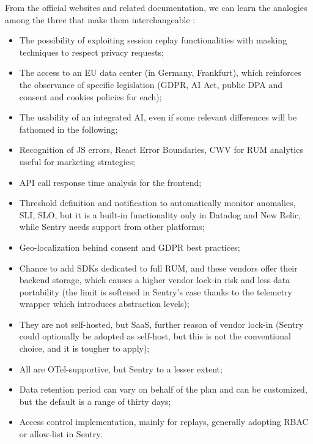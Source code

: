 \documentclass[12pt,a4paper,openright,twoside]{book}
\begin{document}
From the official websites and related documentation, we can learn the analogies among the three that make them interchangeable \cite{Datadog,NewRelic,Sentry}:
\begin{itemize}
    \item The possibility of exploiting session replay functionalities with masking techniques to respect privacy requests;
    \item The access to an EU data center (in Germany, Frankfurt), which reinforces the observance of specific legislation (\ac{GDPR}, AI Act, public DPA and consent and cookies policies for each);
    \item The usability of an integrated AI, even if some relevant differences will be fathomed in the following;
    \item Recognition of JS errors, React Error Boundaries, \ac{CWV} for RUM analytics useful for marketing strategies; 
    \item API call response time analysis for the frontend;
    \item Threshold definition and notification to automatically monitor anomalies, \ac{SLI}, \ac{SLO}, but it is a built-in functionality only in Datadog and New Relic, while Sentry needs support from other platforms;
    \item Geo-localization behind consent and GDPR best practices;
    \item Chance to add SDKs dedicated to full RUM, and these vendors offer their backend storage, which causes a higher vendor lock-in risk and less data portability (the limit is softened in Sentry's case thanks to the telemetry wrapper which introduces abstraction levels);
    \item They are not self-hosted, but \ac{SaaS}, further reason of vendor lock-in (Sentry could optionally be adopted as self-host, but this is not the conventional choice, and it is tougher to apply);
    \item All are OTel-supportive, but Sentry to a lesser extent; 
    \item Data retention period can vary on behalf of the plan and can be customized, but the default is a range of thirty days;
    \item Access control implementation, mainly for replays, generally adopting \ac{RBAC} or allow-list in Sentry.
\end{itemize}
\end{document}
